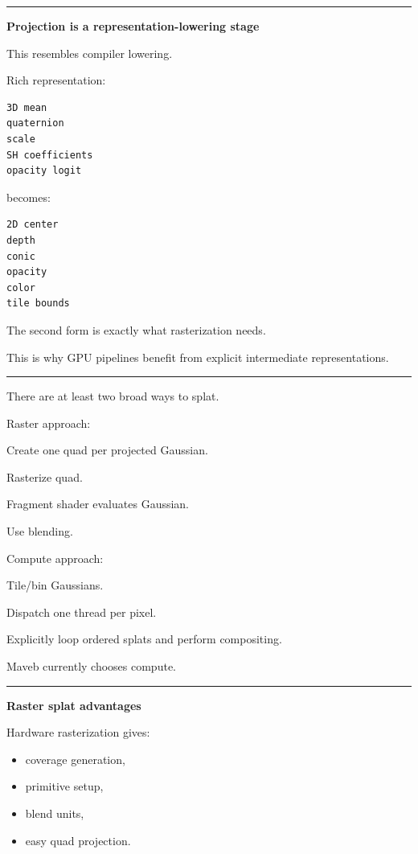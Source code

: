\begin{center}\rule{0.5\linewidth}{0.5pt}\end{center}

\textbf{Projection is a representation-lowering stage}

This resembles compiler lowering.

Rich representation:

\protect{}\label{jyhwui}%
\begin{verbatim}
3D mean
quaternion
scale
SH coefficients
opacity logit
\end{verbatim}

becomes:

\protect{}\label{z54oi2}%
\begin{verbatim}
2D center
depth
conic
opacity
color
tile bounds
\end{verbatim}

The second form is exactly what rasterization needs.

This is why GPU pipelines benefit from explicit intermediate representations.

\begin{center}\rule{0.5\linewidth}{0.5pt}\end{center}

There are at least two broad ways to splat.

Raster approach:

Create one quad per projected Gaussian.

Rasterize quad.

Fragment shader evaluates Gaussian.

Use blending.

Compute approach:

Tile/bin Gaussians.

Dispatch one thread per pixel.

Explicitly loop ordered splats and perform compositing.

Maveb currently chooses compute.

\begin{center}\rule{0.5\linewidth}{0.5pt}\end{center}

\textbf{Raster splat advantages}

Hardware rasterization gives:

\begin{itemize}
\tightlist
\item
  coverage generation,
\item
  primitive setup,
\item
  blend units,
\item
  easy quad projection.
\end{itemize}

